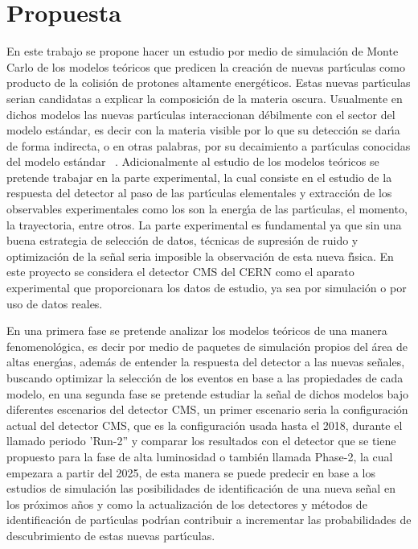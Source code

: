 \chapter{Propuesta}

En este trabajo se propone hacer un estudio por medio de simulaci\'on de Monte Carlo de los modelos te\'oricos que predicen la creaci\'on de nuevas part\'{\i}culas como producto de la colisi\'on de protones altamente energ\'eticos. Estas nuevas part\'{\i}culas serian candidatas a explicar la composici\'on de la materia oscura.  Usualmente en dichos modelos las nuevas part\'{\i}culas interaccionan d\'ebilmente con el sector del modelo est\'andar, es decir con la materia visible por lo que su detecci\'on se dar\'{\i}a de forma indirecta, o en otras palabras, por su decaimiento a part\'{\i}culas conocidas del modelo est\'andar~\cite{Curtin2015} .  Adicionalmente al estudio de los modelos te\'oricos se pretende trabajar en la parte experimental, la cual consiste en el estudio de la respuesta del detector al paso de las part\'{\i}culas elementales y extracci\'on de los observables experimentales como los son la energ\'{\i}a de las part\'{\i}culas, el momento, la trayectoria, entre otros.  La parte experimental es fundamental ya que sin una buena estrategia de selecci\'on de datos, t\'ecnicas de supresi\'on de ruido y optimizaci\'on de la se\~nal seria imposible la observaci\'on de esta nueva f\'{\i}sica. En este proyecto se considera el detector CMS del CERN como el aparato experimental que proporcionara los datos de estudio, ya sea por simulaci\'on o por uso de datos reales.  

En una primera fase se pretende analizar los modelos te\'oricos de una manera fenomenol\'ogica, es decir por medio de paquetes de simulaci\'on propios del \'area de altas energ\'{\i}as, adem\'as de entender la respuesta del detector a las nuevas se\~nales, buscando optimizar la selecci\'on de los eventos en base a las propiedades de cada modelo, en una segunda fase se pretende estudiar la se\~nal de dichos modelos bajo diferentes escenarios del detector CMS, un primer escenario seria la configuraci\'on actual del detector CMS, que es la configuraci\'on usada hasta el 2018, durante el llamado periodo 'Run-2'' y comparar los resultados con el detector que se tiene propuesto para la fase de alta luminosidad o tambi\'en llamada Phase-2, la cual empezara  a partir del 2025, de esta manera se puede predecir en base a los estudios de simulaci\'on las posibilidades de identificaci\'on de una nueva se\~nal en los pr\'oximos a\~nos y como la actualizaci\'on de los detectores y m\'etodos de identificaci\'on de part\'{\i}culas podr\'{\i}an contribuir a incrementar las probabilidades de descubrimiento de estas nuevas part\'{\i}culas. 


